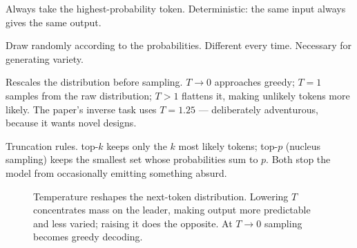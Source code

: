 \begin{description}[leftmargin=0cm,style=nextline,itemsep=5pt]
\item[Greedy decoding.] Always take the highest-probability token.
  Deterministic: the same input always gives the same output.

\item[Sampling.] Draw randomly according to the probabilities. Different every
  time. Necessary for generating variety.

\item[Temperature $T$.] Rescales the distribution before sampling.
  $T \to 0$ approaches greedy; $T = 1$ samples from the raw distribution;
  $T > 1$ flattens it, making unlikely tokens more likely. The paper's inverse
  task uses $T = 1.25$ --- deliberately adventurous, because it wants novel
  designs.

\item[top-$k$ and top-$p$.] Truncation rules. top-$k$ keeps only the $k$ most
  likely tokens; top-$p$ (nucleus sampling) keeps the smallest set whose
  probabilities sum to $p$. Both stop the model from occasionally emitting
  something absurd.
\end{description}

\begin{figure}[htbp]
\centering
{}
\caption[Temperature]{Temperature reshapes the next-token distribution.
Lowering $T$ concentrates mass on the leader, making output more predictable
and less varied; raising it does the opposite. At $T \to 0$ sampling becomes
greedy decoding.}
\label{fig:temperature}
\end{figure}

